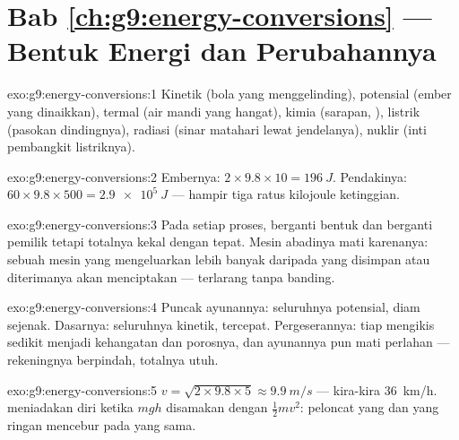 \section*{Bab \ref{ch:g9:energy-conversions} --- Bentuk Energi dan Perubahannya}

\begin{solution}{exo:g9:energy-conversions:1}
Kinetik (bola yang menggelinding), potensial (ember yang dinaikkan),
termal (air mandi yang hangat), kimia (sarapan, ), listrik
(pasokan dindingnya), radiasi (sinar matahari lewat jendelanya),
nuklir (inti pembangkit listriknya).
\end{solution}

\begin{solution}{exo:g9:energy-conversions:2}
Embernya: $2 \times 9.8 \times 10 = \qty{196}{J}$. Pendakinya: $60
\times 9.8 \times 500 = \qty{2.9e5}{J}$ --- hampir tiga ratus
kilojoule ketinggian.
\end{solution}

\begin{solution}{exo:g9:energy-conversions:3}
Pada setiap proses,  berganti bentuk dan berganti pemilik tetapi
totalnya kekal dengan tepat. Mesin abadinya mati karenanya: sebuah
mesin yang mengeluarkan lebih banyak daripada yang disimpan atau
diterimanya akan menciptakan  --- terlarang tanpa banding.
\end{solution}

\begin{solution}{exo:g9:energy-conversions:4}
Puncak ayunannya: seluruhnya potensial, diam sejenak. Dasarnya:
seluruhnya kinetik, tercepat. Pergeserannya: tiap  mengikis
sedikit menjadi kehangatan  dan porosnya, dan ayunannya pun mati
perlahan --- rekeningnya berpindah, totalnya utuh.
\end{solution}

\begin{solution}{exo:g9:energy-conversions:5}
$v = \sqrt{2 \times 9.8 \times 5} \approx \qty{9.9}{m/s}$ ---
kira-kira \qty{36}{km/h}.  meniadakan diri ketika $m g h$
disamakan dengan $\frac12 m v^2$: peloncat yang  dan yang ringan
mencebur pada  yang sama.
\end{solution}

